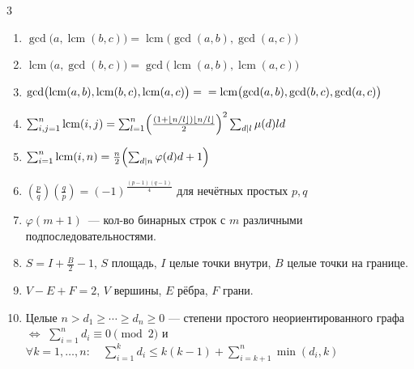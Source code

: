 \documentclass[8pt,a4paper,landscape,twosided]{extarticle}
\begin{document}
\begin{multicols*}{3}
\begin{enumerate}
\item %
$\gcd\bigl(a,\operatorname{lcm}(b,c)\bigr)=\operatorname{lcm}\bigl(\gcd(a,b),\gcd(a,c)\bigr)$

\item %
$\operatorname{lcm}\bigl(a,\gcd(b,c)\bigr)=\gcd\bigl(\operatorname{lcm}(a,b),\operatorname{lcm}(a,c)\bigr)$

\item %
$\gcd\bigl(\operatorname{lcm}(a,b),\operatorname{lcm}(b,c),\operatorname{lcm}(a,c)\bigr)
 =\\= \operatorname{lcm}\bigl(\gcd(a,b),\gcd(b,c),\gcd(a,c)\bigr)$

\item %
$\sum_{i,j=1}^n\operatorname{lcm}(i,j)
=\sum_{l=1}^n\Bigl(\frac{(1+\lfloor n/l\rfloor)\lfloor n/l\rfloor}{2}\Bigr)^2\sum_{d\mid l}\mu(d)ld$

\item %
$\sum_{i=1}^n\operatorname{lcm}(i,n)=\frac{n}{2}\Bigl(\sum_{d\mid n}\varphi(d)d+1\Bigr)$

\item %
$\left(\tfrac{p}{q}\right)\left(\tfrac{q}{p}\right)=(-1)^{\frac{(p-1)(q-1)}{4}}$
 для нечётных простых $p,q$

\item %
$\varphi(m+1)$~--- кол-во бинарных строк с $m$ различными подпоследовательностями.

\item %
$S=I+\frac{B}{2}-1$, $S$ площадь, $I$ целые точки внутри, $B$ целые точки на границе.

\item %
$V-E+F=2$, $V$ вершины, $E$ рёбра, $F$ грани.

\item %
Целые $n>d_1\ge\cdots\ge d_n\ge0$ — степени простого неориентированного графа $\iff$
$\sum_{i=1}^n d_i\equiv0\pmod2$ и
\\ $\forall k=1,\ldots,n:\quad \sum_{i=1}^k d_i\le k(k-1)+\sum_{i=k+1}^n\min(d_i,k)$


\end{enumerate}
\end{multicols*}
\end{document}
